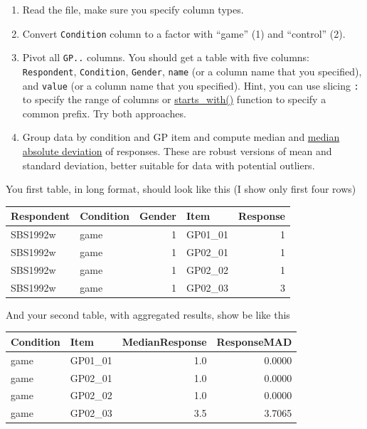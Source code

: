 \documentclass[
]{book}
\providecommand{\tightlist}{%
  \setlength{\itemsep}{0pt}\setlength{\parskip}{0pt}}
\begin{document}
\begin{enumerate}
\def\labelenumi{\arabic{enumi}.}
\tightlist
\item
  Read the file, make sure you specify column types.
\item
  Convert \texttt{Condition} column to a factor with ``game'' (1) and ``control'' (2).
\item
  Pivot all \texttt{GP..} columns. You should get a table with five columns: \texttt{Respondent}, \texttt{Condition}, \texttt{Gender}, \texttt{name} (or a column name that you specified), and \texttt{value} (or a column name that you specified). Hint, you can use slicing \texttt{:} to specify the range of columns or \href{https://tidyselect.r-lib.org/reference/starts_with.html}{starts\_with()} function to specify a common prefix. Try both approaches.
\item
  Group data by condition and GP item and compute median and \href{https://stat.ethz.ch/R-manual/R-devel/library/stats/html/mad.html}{median absolute deviation} of responses. These are robust versions of mean and standard deviation, better suitable for data with potential outliers.
\end{enumerate}

You first table, in long format, should look like this (I show only first four rows)

\begin{tabular}{l|l|r|l|r}
\hline
Respondent & Condition & Gender & Item & Response\\
\hline
SBS1992w & game & 1 & GP01\_01 & 1\\
\hline
SBS1992w & game & 1 & GP02\_01 & 1\\
\hline
SBS1992w & game & 1 & GP02\_02 & 1\\
\hline
SBS1992w & game & 1 & GP02\_03 & 3\\
\hline
\end{tabular}

And your second table, with aggregated results, show be like this

\begin{tabular}{l|l|r|r}
\hline
Condition & Item & MedianResponse & ResponseMAD\\
\hline
game & GP01\_01 & 1.0 & 0.0000\\
\hline
game & GP02\_01 & 1.0 & 0.0000\\
\hline
game & GP02\_02 & 1.0 & 0.0000\\
\hline
game & GP02\_03 & 3.5 & 3.7065\\
\hline
\end{tabular}
\end{document}
